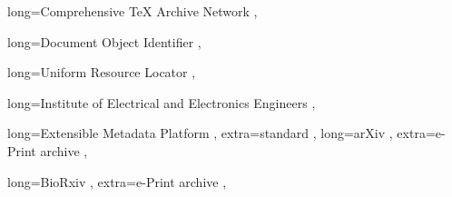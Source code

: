  {
    long=Comprehensive TeX Archive Network ,
}

 {
    long=Document Object Identifier ,
}

 {
    long=Uniform Resource Locator ,
}

 {
    long=Institute of Electrical and Electronics Engineers ,
}

 {
    long=Extensible Metadata Platform ,
    extra=standard ,
}
 {
    long=arXiv ,
    extra=e-Print archive ,
}

 {
    long=BioRxiv ,
    extra=e-Print archive ,
}
